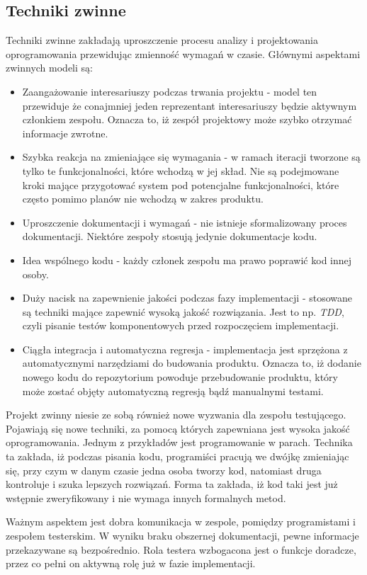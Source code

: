 \subsection{Techniki zwinne}
Techniki zwinne zakładają uproszczenie procesu analizy i projektowania oprogramowania przewidując zmienność wymagań w czasie. Głównymi aspektami zwinnych modeli są:
\begin{itemize}
  \item Zaangażowanie interesariuszy podczas trwania projektu - model ten przewiduje że conajmniej jeden reprezentant interesariuszy będzie aktywnym członkiem zespołu. Oznacza to, iż zespół projektowy może szybko otrzymać informacje zwrotne.
  \item Szybka reakcja na zmieniające się wymagania - w ramach iteracji tworzone są tylko te funkcjonalności, które wchodzą w jej skład. Nie są podejmowane kroki mające przygotować system pod potencjalne funkcjonalności, które często pomimo planów nie wchodzą w zakres produktu. 
  \item Uproszczenie dokumentacji i wymagań - nie istnieje sformalizowany proces dokumentacji. Niektóre zespoły stosują jedynie dokumentacje kodu.
  \item Idea wspólnego kodu - każdy członek zespołu ma prawo poprawić kod innej osoby.
  \item Duży nacisk na zapewnienie jakości podczas fazy implementacji - stosowane są techniki mające zapewnić wysoką jakość rozwiązania. Jest to np. \textit{TDD}, czyli pisanie testów komponentowych przed rozpoczęciem implementacji.
  \item Ciągła integracja i automatyczna regresja - implementacja jest sprzężona z automatycznymi narzędziami do budowania produktu. Oznacza to, iż dodanie nowego kodu do repozytorium powoduje przebudowanie produktu, który może zostać objęty automatyczną regresją bądź manualnymi testami.
\end{itemize}
Projekt zwinny niesie ze sobą również nowe wyzwania dla zespołu testującego. Pojawiają się nowe techniki, za pomocą których zapewniana jest wysoka jakość oprogramowania. Jednym z przykładów jest programowanie w parach. Technika ta zakłada, iż podczas pisania kodu, programiści pracują we dwójkę zmieniając się, przy czym w danym czasie jedna osoba tworzy kod, natomiast druga kontroluje i szuka lepszych rozwiązań. Forma ta zakłada, iż kod taki jest już wstępnie zweryfikowany i nie wymaga innych formalnych metod. 

Ważnym aspektem jest dobra komunikacja w zespole, pomiędzy programistami i zespołem testerskim. W wyniku braku obszernej dokumentacji, pewne informacje przekazywane są bezpośrednio. Rola testera wzbogacona jest o funkcje doradcze, przez co pełni on aktywną rolę już w fazie implementacji.

